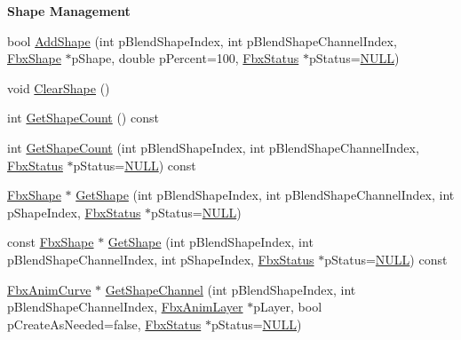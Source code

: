 \begin{Indent}\textbf{ Shape Management}\par
\begin{DoxyCompactItemize}
\item 
bool \hyperlink{class_fbx_geometry_a4b9464c1f35f6bad8f2f19e427e70c9f}{Add\+Shape} (int p\+Blend\+Shape\+Index, int p\+Blend\+Shape\+Channel\+Index, \hyperlink{class_fbx_shape}{Fbx\+Shape} $\ast$p\+Shape, double p\+Percent=100, \hyperlink{class_fbx_status}{Fbx\+Status} $\ast$p\+Status=\hyperlink{fbxarch_8h_a070d2ce7b6bb7e5c05602aa8c308d0c4}{N\+U\+LL})
\item 
void \hyperlink{class_fbx_geometry_a6f5e46228d45b12e4f513abb56b8226d}{Clear\+Shape} ()
\item 
int \hyperlink{class_fbx_geometry_a9aa043cfb8856ef48b53b8cb7c8191b3}{Get\+Shape\+Count} () const
\item 
int \hyperlink{class_fbx_geometry_a34b10144646e4788f3702b9ebfa06dc2}{Get\+Shape\+Count} (int p\+Blend\+Shape\+Index, int p\+Blend\+Shape\+Channel\+Index, \hyperlink{class_fbx_status}{Fbx\+Status} $\ast$p\+Status=\hyperlink{fbxarch_8h_a070d2ce7b6bb7e5c05602aa8c308d0c4}{N\+U\+LL}) const
\item 
\hyperlink{class_fbx_shape}{Fbx\+Shape} $\ast$ \hyperlink{class_fbx_geometry_a8a60c0db307689b6d4fb6055055a1601}{Get\+Shape} (int p\+Blend\+Shape\+Index, int p\+Blend\+Shape\+Channel\+Index, int p\+Shape\+Index, \hyperlink{class_fbx_status}{Fbx\+Status} $\ast$p\+Status=\hyperlink{fbxarch_8h_a070d2ce7b6bb7e5c05602aa8c308d0c4}{N\+U\+LL})
\item 
const \hyperlink{class_fbx_shape}{Fbx\+Shape} $\ast$ \hyperlink{class_fbx_geometry_a8e9fba2b422ca2f4f5b4deda107fce7f}{Get\+Shape} (int p\+Blend\+Shape\+Index, int p\+Blend\+Shape\+Channel\+Index, int p\+Shape\+Index, \hyperlink{class_fbx_status}{Fbx\+Status} $\ast$p\+Status=\hyperlink{fbxarch_8h_a070d2ce7b6bb7e5c05602aa8c308d0c4}{N\+U\+LL}) const
\item 
\hyperlink{class_fbx_anim_curve}{Fbx\+Anim\+Curve} $\ast$ \hyperlink{class_fbx_geometry_a5a0e6869e72e17e9d0e7d2bb20264828}{Get\+Shape\+Channel} (int p\+Blend\+Shape\+Index, int p\+Blend\+Shape\+Channel\+Index, \hyperlink{class_fbx_anim_layer}{Fbx\+Anim\+Layer} $\ast$p\+Layer, bool p\+Create\+As\+Needed=false, \hyperlink{class_fbx_status}{Fbx\+Status} $\ast$p\+Status=\hyperlink{fbxarch_8h_a070d2ce7b6bb7e5c05602aa8c308d0c4}{N\+U\+LL})
\end{DoxyCompactItemize}
\end{Indent}
